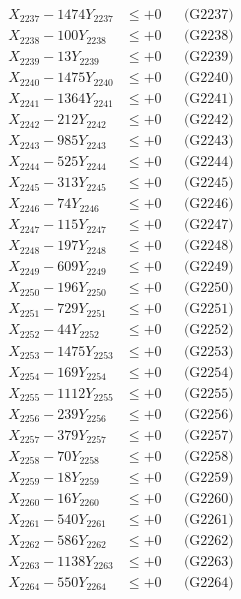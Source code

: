 \documentclass[a4paper,10pt]{article}
\begin{document}
{\begin{align}
X_{2237} - 1474Y_{2237} &\leq +0 && \text{(G2237)} \\
X_{2238} - 100Y_{2238} &\leq +0 && \text{(G2238)} \\
X_{2239} - 13Y_{2239} &\leq +0 && \text{(G2239)} \\
X_{2240} - 1475Y_{2240} &\leq +0 && \text{(G2240)} \\
\allowbreak
X_{2241} - 1364Y_{2241} &\leq +0 && \text{(G2241)} \\
X_{2242} - 212Y_{2242} &\leq +0 && \text{(G2242)} \\
X_{2243} - 985Y_{2243} &\leq +0 && \text{(G2243)} \\
X_{2244} - 525Y_{2244} &\leq +0 && \text{(G2244)} \\
X_{2245} - 313Y_{2245} &\leq +0 && \text{(G2245)} \\
X_{2246} - 74Y_{2246} &\leq +0 && \text{(G2246)} \\
X_{2247} - 115Y_{2247} &\leq +0 && \text{(G2247)} \\
X_{2248} - 197Y_{2248} &\leq +0 && \text{(G2248)} \\
X_{2249} - 609Y_{2249} &\leq +0 && \text{(G2249)} \\
X_{2250} - 196Y_{2250} &\leq +0 && \text{(G2250)} \\
\allowbreak
X_{2251} - 729Y_{2251} &\leq +0 && \text{(G2251)} \\
X_{2252} - 44Y_{2252} &\leq +0 && \text{(G2252)} \\
X_{2253} - 1475Y_{2253} &\leq +0 && \text{(G2253)} \\
X_{2254} - 169Y_{2254} &\leq +0 && \text{(G2254)} \\
X_{2255} - 1112Y_{2255} &\leq +0 && \text{(G2255)} \\
X_{2256} - 239Y_{2256} &\leq +0 && \text{(G2256)} \\
X_{2257} - 379Y_{2257} &\leq +0 && \text{(G2257)} \\
X_{2258} - 70Y_{2258} &\leq +0 && \text{(G2258)} \\
X_{2259} - 18Y_{2259} &\leq +0 && \text{(G2259)} \\
X_{2260} - 16Y_{2260} &\leq +0 && \text{(G2260)} \\
\allowbreak
X_{2261} - 540Y_{2261} &\leq +0 && \text{(G2261)} \\
X_{2262} - 586Y_{2262} &\leq +0 && \text{(G2262)} \\
X_{2263} - 1138Y_{2263} &\leq +0 && \text{(G2263)} \\
X_{2264} - 550Y_{2264} &\leq +0 && \text{(G2264)} \\

\end{align}}
\end{document}
